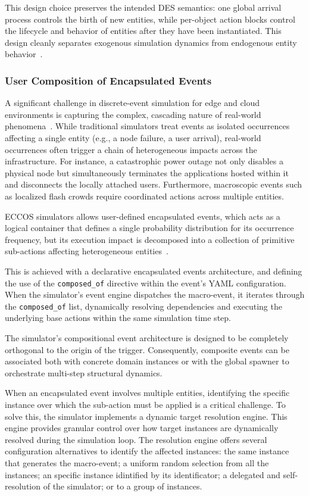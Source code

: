 \documentclass[ASNA]{USG} %
\begin{document}
This design choice preserves the intended DES semantics: one global arrival process controls the birth of new entities, while per-object action blocks control the lifecycle and behavior of entities after they have been instantiated. This design cleanly separates exogenous simulation dynamics from endogenous entity behavior~\cite{Ullrich2017An}.


\subsubsection{User Composition of Encapsulated Events}
\label{sect_usercompositionofencapsulatedevents}

A significant challenge in discrete-event simulation for edge and cloud environments is capturing the complex, cascading nature of real-world phenomena~\cite{Higashino2016CEPSim}. While traditional simulators treat events as isolated occurrences affecting a single entity (e.g., a node failure, a user arrival), real-world occurrences often trigger a chain of heterogeneous impacts across the infrastructure. For instance, a catastrophic power outage not only disables a physical node but simultaneously terminates the applications hosted within it and disconnects the locally attached users. Furthermore, macroscopic events such as localized flash crowds require coordinated actions across multiple entities. 

\textsc{ECCOS} simulators allows user-defined encapsulated events, which acts as a logical container that defines a single probability distribution for its occurrence frequency, but its execution impact is decomposed into a collection of primitive sub-actions affecting heterogeneous entities~\cite{Zhu2017A}. 

This is achieved with a declarative encapsulated events architecture, and defining the use of the \texttt{composed\_of} directive within the event's YAML configuration. When the simulator's event engine dispatches the macro-event, it iterates through the \texttt{composed\_of} list, dynamically resolving dependencies and executing the underlying base actions within the same simulation time step. 

The simulator's compositional event architecture is designed to be completely orthogonal to the origin of the trigger. Consequently, composite events can be associated both with concrete domain instances or with the global spawner to orchestrate multi-step structural dynamics.

When an encapsulated event involves multiple entities, identifying the specific instance over which the sub-action must be applied is a critical challenge. To solve this, the simulator implements a dynamic target resolution engine. This engine provides granular control over how target instances are dynamically resolved during the simulation loop. The resolution engine offers several configuration alternatives to identify the affected instances: the same instance that generates the macro-event; a uniform random selection from all the instances; an specific instance idintified by its identificator; a delegated and self-resolution of the simulator; or to a group of instances.
\end{document}
